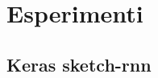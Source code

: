 \chapter{Esperimenti}
\section{Keras sketch-rnn} %
\label{sub:keras_sketch_rnn}

\begin{lstlisting}[language = Python, frame = single]

\end{lstlisting}